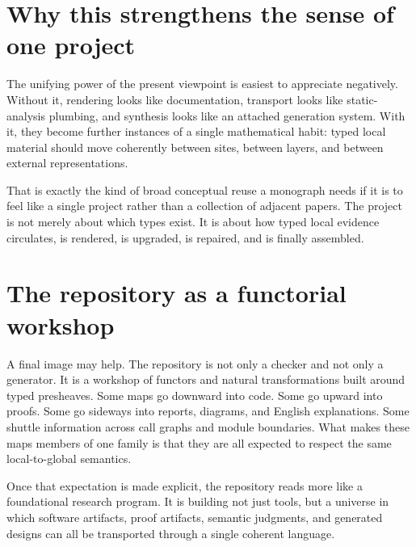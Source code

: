 \section*{Why this strengthens the sense of one project}
The unifying power of the present viewpoint is easiest to appreciate negatively. Without it,
rendering looks like documentation, transport looks like static-analysis plumbing, and
synthesis looks like an attached generation system. With it, they become further instances of
a single mathematical habit: typed local material should move coherently between sites,
between layers, and between external representations.

That is exactly the kind of broad conceptual reuse a monograph needs if it is to feel like a
single project rather than a collection of adjacent papers. The project is not merely about
which types exist. It is about how typed local evidence circulates, is rendered, is upgraded,
is repaired, and is finally assembled.

\section*{The repository as a functorial workshop}
A final image may help. The repository is not only a checker and not only a generator. It is
a workshop of functors and natural transformations built around typed presheaves. Some maps
go downward into code. Some go upward into proofs. Some go sideways into reports, diagrams,
and English explanations. Some shuttle information across call graphs and module boundaries.
What makes these maps members of one family is that they are all expected to respect the same
local-to-global semantics.

Once that expectation is made explicit, the repository reads more like a foundational
research program. It is building not just tools, but a universe in which software artifacts,
proof artifacts, semantic judgments, and generated designs can all be transported through a
single coherent language.
